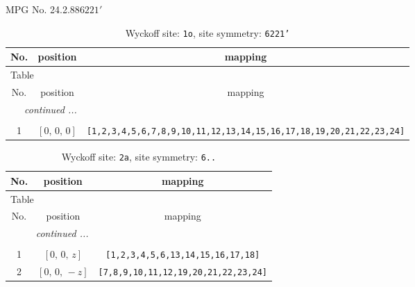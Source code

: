 \documentclass[fleqn,8pt]{jsarticle}
\begin{document}
\setcounter{MaxMatrixCols}{32}

\renewcommand{\tablename}{Table~}
\renewcommand{\figurename}{Figure~}
\begin{center}
\LARGE
MPG No. 24.2.88\quad$6221'$
\end{center}
\renewcommand{\arraystretch}{1.2}
\begin{longtable}{ccc}
\caption{Wyckoff site: {\tt 1o}, site symmetry: {\tt 6221'}}
 \\
 \hline \hline
No. & position & mapping \\ \hline \endfirsthead

\multicolumn{2}{l}{\tablename\ \thetable{}} \\
 \hline \hline
No. & position & mapping \\ \hline \endhead

 \hline \hline
\multicolumn{2}{r}{\footnotesize\it continued ...} \\ \endfoot

 \hline \hline
\multicolumn{2}{r}{} \\ \endlastfoot

1 & $\left[ 0,\, 0,\, 0 \right]$ & {\tt [1,2,3,4,5,6,7,8,9,10,11,12,13,14,15,16,17,18,19,20,21,22,23,24]} \\
\end{longtable}
\renewcommand{\arraystretch}{1.2}
\begin{longtable}{ccc}
\caption{Wyckoff site: {\tt 2a}, site symmetry: {\tt 6..}}
 \\
 \hline \hline
No. & position & mapping \\ \hline \endfirsthead

\multicolumn{2}{l}{\tablename\ \thetable{}} \\
 \hline \hline
No. & position & mapping \\ \hline \endhead

 \hline \hline
\multicolumn{2}{r}{\footnotesize\it continued ...} \\ \endfoot

 \hline \hline
\multicolumn{2}{r}{} \\ \endlastfoot

1 & $\left[ 0,\, 0,\, z \right]$ & {\tt [1,2,3,4,5,6,13,14,15,16,17,18]} \\ \hline
2 & $\left[ 0,\, 0,\, - z \right]$ & {\tt [7,8,9,10,11,12,19,20,21,22,23,24]} \\
\end{longtable}
\renewcommand{\arraystretch}{1.2}
\end{document}
